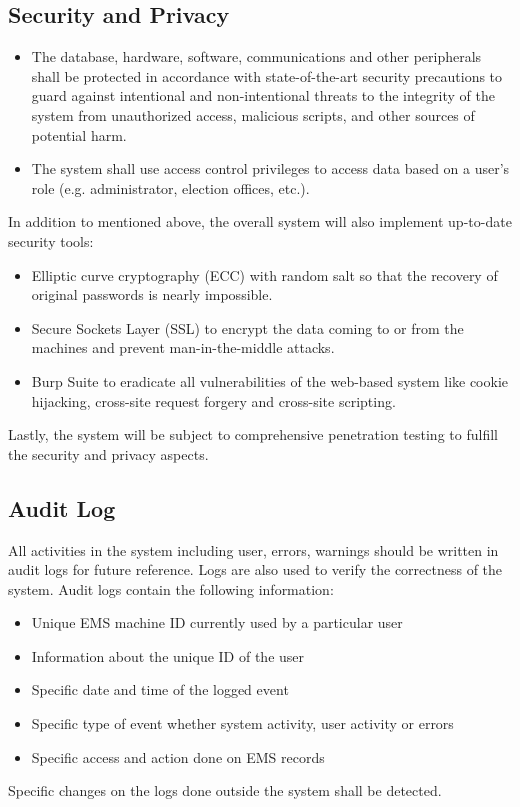 \documentclass[a4paper, 11pt]{article}
\begin{document}
\subsection{Security and Privacy}
\begin{itemize}
	\item The database, hardware, software, communications and other peripherals shall be protected in accordance with state-of-the-art security precautions to guard against intentional and non-intentional threats to the integrity of the system from unauthorized access, malicious scripts, and other sources of potential harm.
	\item The system shall use access control privileges to access data based on a user's role (e.g. administrator, election offices, etc.).
\end{itemize}
In addition to mentioned above, the overall system will also implement up-to-date security tools:
\begin{itemize}
	\item Elliptic curve cryptography (ECC) with random salt so that the recovery of original passwords is nearly impossible.
	\item Secure Sockets Layer (SSL) to encrypt the data coming to or from the machines and prevent man-in-the-middle attacks.
	\item Burp Suite to eradicate all vulnerabilities of the web-based system like cookie hijacking, cross-site request forgery and cross-site scripting.
\end{itemize}
Lastly, the system will be subject to comprehensive penetration testing to fulfill the security and privacy aspects.

\subsection{Audit Log}
All activities in the system including user, errors, warnings should be written in audit logs for future reference. Logs are also used to verify the correctness of the system. Audit logs contain the following information:
\begin{itemize}
	\item Unique EMS machine ID currently used by a particular user
	\item Information about the unique ID of the user
	\item Specific date and time of the logged event
	\item Specific type of event whether system activity, user activity or errors
	\item Specific access and action done on EMS records
\end{itemize}
Specific changes on the logs done outside the system shall be detected.
\end{document}
